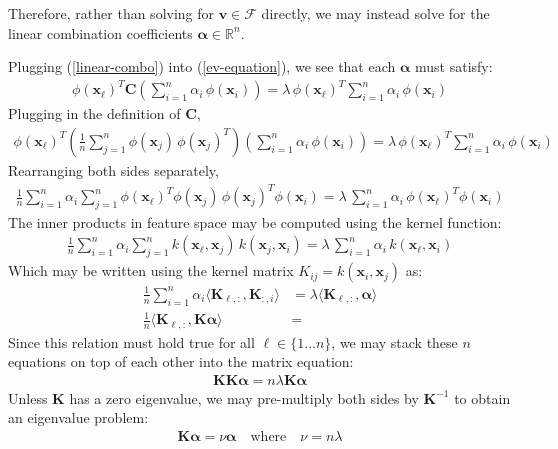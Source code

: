 \documentclass[]{article}
\newcommand{\reals}{\mathbb{R}}
\begin{document}
Therefore, rather than solving for $\mathbf{v} \in \mathcal{F}$ directly, we may instead solve for the linear combination coefficients $\boldsymbol{\alpha} \in \reals^n$.

Plugging (\ref{linear-combo}) into (\ref{ev-equation}), we see that each $\boldsymbol{\alpha}$ must satisfy: 
\begin{align}
\phi(\mathbf{x}_{\ell})^T \mathbf{C} \left( \sum_{i=1}^n \alpha_i \, \phi(\mathbf{x}_i) \right) = \lambda \, \phi(\mathbf{x}_\ell)^T \sum_{i=1}^n \alpha_i \, \phi(\mathbf{x}_i)
\end{align}
Plugging in the definition of $\mathbf{C}$,
\begin{align}
\label{the-equation}
\phi(\mathbf{x}_{\ell})^T \left(  \frac{1}{n} \sum_{j=1}^n \phi(\mathbf{x}_j) \, \phi(\mathbf{x}_j)^T \right) \left( \sum_{i=1}^n \alpha_i \, \phi(\mathbf{x}_i) \right) = \lambda \, \phi(\mathbf{x}_\ell)^T \sum_{i=1}^n \alpha_i \, \phi(\mathbf{x}_i)
\end{align}
Rearranging both sides separately,
\begin{align}
\frac{1}{n} \sum_{i=1}^n \alpha_i \sum_{j=1}^n\phi(\mathbf{x}_{\ell})^T \phi(\mathbf{x}_j) \, \phi(\mathbf{x}_j)^T  \phi(\mathbf{x}_i)  = \lambda \, \sum_{i=1}^n \alpha_i \, \phi(\mathbf{x}_\ell)^T \phi(\mathbf{x}_i)
\end{align}
The inner products in feature space may be computed using the kernel function:
\begin{align}
\label{replace-with-kernel}
\frac{1}{n} \sum_{i=1}^n \alpha_i \sum_{j=1}^n k(\mathbf{x}_{\ell}, \mathbf{x}_j) \, k(\mathbf{x}_j, \mathbf{x}_i) = \lambda \, \sum_{i=1}^n \alpha_i \, k(\mathbf{x}_{\ell}, \mathbf{x}_i)
\end{align}
Which may be written using the kernel matrix $K_{ij} = k(\mathbf{x}_i, \mathbf{x}_j)$ as:
\begin{align*}
\frac{1}{n} \sum_{i=1}^n \alpha_i \langle \mathbf{K}_{\ell,:}, \mathbf{K}_{:,i} \rangle &= \lambda \langle \mathbf{K}_{\ell,:}, \boldsymbol{\alpha} \rangle \\
\frac{1}{n}  \langle \mathbf{K}_{\ell,:}, \mathbf{K} \boldsymbol{\alpha} \rangle &= 
\end{align*}
Since this relation must hold true for all $\ell \in \{1 \hdots n\}$, we may stack these $n$ equations on top of each other into the matrix equation:
\begin{align}
\label{kk}
\mathbf{K} \mathbf{K} \boldsymbol{\alpha} = n \lambda \mathbf{K} \boldsymbol{\alpha} 
\end{align}
Unless $\mathbf{K}$ has a zero eigenvalue, we may pre-multiply both sides by $\mathbf{K}^{-1}$ to obtain an eigenvalue problem:
\begin{align}
\label{eigenvalue-problem}
\mathbf{K} \boldsymbol{\alpha} = \nu \boldsymbol{\alpha} \quad \text{where} \quad \nu = n \lambda
\end{align}
\end{document}
